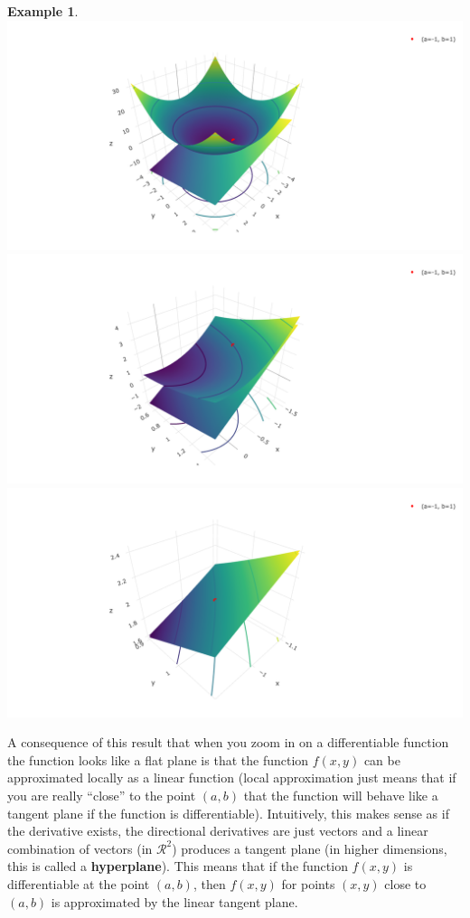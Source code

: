 \documentclass[
]{book}
\theoremstyle{definition}
\theoremstyle{definition}
\newtheorem{example}{Example}[chapter]
\theoremstyle{definition}
\theoremstyle{definition}
\theoremstyle{remark}
\begin{document}
\begin{example}
\includegraphics[width=1\linewidth]{./webshot-images/tangent1}
\includegraphics[width=1\linewidth]{./webshot-images/tangent2}
\includegraphics[width=1\linewidth]{./webshot-images/tangent3}
\end{example}

A consequence of this result that when you zoom in on a differentiable function the function looks like a flat plane is that the function \(f(x, y)\) can be approximated locally as a linear function (local approximation just means that if you are really ``close'' to the point \((a, b)\) that the function will behave like a tangent plane if the function is differentiable). Intuitively, this makes sense as if the derivative exists, the directional derivatives are just vectors and a linear combination of vectors (in \(\mathcal{R}^2\)) produces a tangent plane (in higher dimensions, this is called a \textbf{hyperplane}). This means that if the function \(f(x, y)\) is differentiable at the point \((a, b)\), then \(f(x, y)\) for points \((x, y)\) close to \((a, b)\) is approximated by the linear tangent plane.
\end{document}
